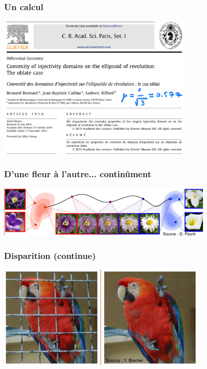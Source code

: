 \documentclass[9pt]{beamer}
\begin{document}
\begin{frame}
\frametitle{\bf Un calcul}
 
\centering \includegraphics[height=7.0cm]{cras2}

\end{frame}

\begin{frame}
\frametitle{\bf D'une fleur \`a l'autre... contin\^ument}
 
\centering \includegraphics[height=2.5cm]{fleur}

\end{frame}

\begin{frame}
\frametitle{\bf Disparition (continue)}
 
\centering \includegraphics[height=5.0cm]{parrot}

\end{frame}
\end{document}
